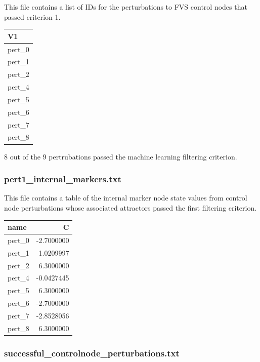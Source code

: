 \documentclass[
]{book}
\begin{document}
This file contains a list of IDs for the perturbations to FVS control nodes that passed criterion 1.

\begin{tabular}{l}
\hline
V1\\
\hline
pert\_0\\
\hline
pert\_1\\
\hline
pert\_2\\
\hline
pert\_4\\
\hline
pert\_5\\
\hline
pert\_6\\
\hline
pert\_7\\
\hline
pert\_8\\
\hline
\end{tabular}

8 out of the 9 pertrubations passed the machine learning filtering criterion.

\hypertarget{section-id}{%
\subsubsection*{pert1\_internal\_markers.txt}\label{section-id}}

This file contains a table of the internal marker node state values from control node perturbations whose associated attractors passed the first filtering criterion.

\begin{tabular}{l|r}
\hline
name & C\\
\hline
pert\_0 & -2.7000000\\
\hline
pert\_1 & 1.0209997\\
\hline
pert\_2 & 6.3000000\\
\hline
pert\_4 & -0.0427445\\
\hline
pert\_5 & 6.3000000\\
\hline
pert\_6 & -2.7000000\\
\hline
pert\_7 & -2.8528056\\
\hline
pert\_8 & 6.3000000\\
\hline
\end{tabular}

\hypertarget{section-id}{%
\subsubsection*{successful\_controlnode\_perturbations.txt}\label{section-id}}
\end{document}
